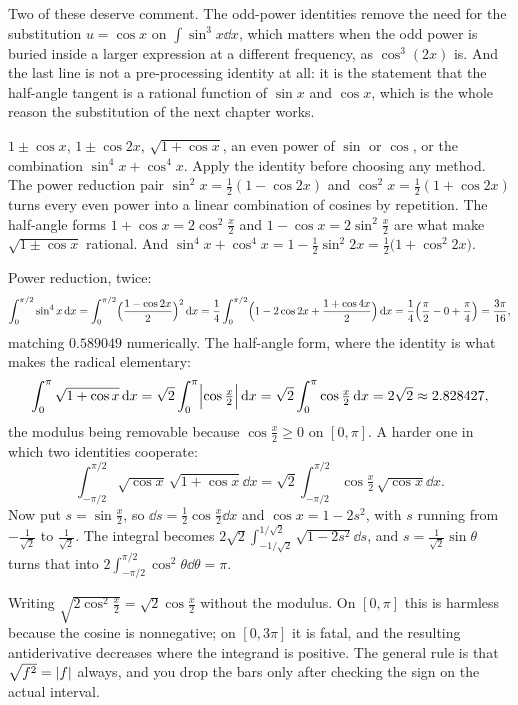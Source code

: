 Two of these deserve comment. The odd-power identities remove the need for the substitution $u=\cos x$ on $\int\sin^3x\dd x$, which matters when the odd power is buried inside a larger expression at a different frequency, as $\cos^3(2x)$ is. And the last line is not a pre-processing identity at all: it is the statement that the half-angle tangent is a rational function of $\sin x$ and $\cos x$, which is the whole reason the substitution of the next chapter works.

\cue $1\pm\cos x$, $1\pm\cos2x$, $\sqrt{1+\cos x}$, an even power of $\sin$ or $\cos$, or the combination $\sin^4x+\cos^4x$.
\method Apply the identity before choosing any method. The power reduction pair $\sin^2x=\tfrac12(1-\cos2x)$ and $\cos^2x=\tfrac12(1+\cos2x)$ turns every even power into a linear combination of cosines by repetition. The half-angle forms $1+\cos x=2\cos^2\tfrac x2$ and $1-\cos x=2\sin^2\tfrac x2$ are what make $\sqrt{1\pm\cos x}$ rational. And $\sin^4x+\cos^4x=1-\tfrac12\sin^2 2x=\tfrac12\bigl(1+\cos^2 2x\bigr)$.

\begin{worked}
Power reduction, twice:
\[
\int_0^{\pi/2}\sin^4x\,\mathrm{d} x=\int_0^{\pi/2}\Bigl(\frac{1-\cos2x}{2}\Bigr)^2\,\mathrm{d} x
=\frac14\int_0^{\pi/2}\Bigl(1-2\cos2x+\frac{1+\cos4x}{2}\Bigr)\,\mathrm{d} x
=\frac14\Bigl(\frac{\pi}{2}-0+\frac{\pi}{4}\Bigr)=\frac{3\pi}{16},
\]
matching $0.589049$ numerically. The half-angle form, where the identity is what makes the radical elementary:
\[
\int_0^{\pi}\sqrt{1+\cos x}\,\mathrm{d} x=\sqrt2\int_0^{\pi}\Bigl|\cos\tfrac x2\Bigr|\,\mathrm{d} x=\sqrt2\int_0^{\pi}\cos\tfrac x2\,\mathrm{d} x=2\sqrt2\approx2.828427 ,
\]
the modulus being removable because $\cos\tfrac x2\geq0$ on $[0,\pi]$. A harder one in which two identities cooperate:
\[
\int_{-\pi/2}^{\pi/2}\sqrt{\cos x}\,\sqrt{1+\cos x}\dd x
=\sqrt2\int_{-\pi/2}^{\pi/2}\cos\tfrac x2\,\sqrt{\cos x}\dd x .
\]
Now put $s=\sin\tfrac x2$, so $\dd s=\tfrac12\cos\tfrac x2\dd x$ and $\cos x=1-2s^2$, with $s$ running from $-\tfrac{1}{\sqrt2}$ to $\tfrac1{\sqrt2}$. The integral becomes $2\sqrt2\int_{-1/\sqrt2}^{1/\sqrt2}\sqrt{1-2s^2}\dd s$, and $s=\tfrac{1}{\sqrt2}\sin\theta$ turns that into $2\int_{-\pi/2}^{\pi/2}\cos^2\theta\dd\theta=\pi$.
\end{worked}

\begin{trap}
Writing $\sqrt{2\cos^2\tfrac x2}=\sqrt2\cos\tfrac x2$ without the modulus. On $[0,\pi]$ this is harmless because the cosine is nonnegative; on $[0,3\pi]$ it is fatal, and the resulting antiderivative decreases where the integrand is positive. The general rule is that $\sqrt{f^2}=\left\lvert f\right\rvert$ always, and you drop the bars only after checking the sign on the actual interval.
\end{trap}

